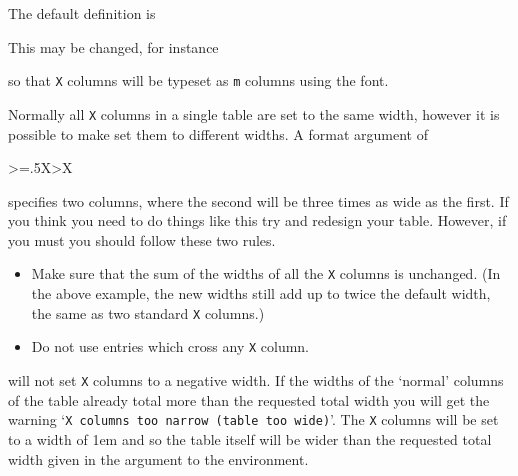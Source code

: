  The default definition is
\begin{lcode}
\newcommand{\tabularxcolumn}[1]{p{#1}}
\end{lcode}
This may be changed, for instance
\begin{lcode}
\renewcommand{\tabularxcolumn}[1]{>{\small}m{#1}}
\end{lcode}
so that \texttt{X} columns will be typeset as \texttt{m} columns using
the \cmd{\small} font.

 Normally all \texttt{X} columns 
in a single table are set to the
 same width, however it is possible to make  set
 them to different widths.
 A format argument of 
\begin{lcode}
{>{\hsize=.5\hsize}X>{\hsize}X}
\end{lcode}
 specifies two columns, where the second will be three times as wide as the
 first. If you think you need to do things like this try and redesign 
your table. However, if you must you should follow these two rules.
 \begin{itemize}
 \item Make sure that the sum of the widths of all the \texttt{X}
 columns is unchanged. (In the above example, the new widths still add
 up to twice the default width, the same as two standard \texttt{X}
 columns.)
 \item Do not use \cmd{\multicolumn} entries which cross any \texttt{X}
 column.
 \end{itemize}


  will not set \texttt{X} columns to a negative width.
If the widths of the `normal' columns of the table already total more 
than the requested total width you will get the warning 
`\texttt{X columns too narrow (table too wide)}'.
 The \texttt{X} columns will be set to a width of 1em
 and so the table itself will be wider than the requested total width
 given in the argument to the environment.

